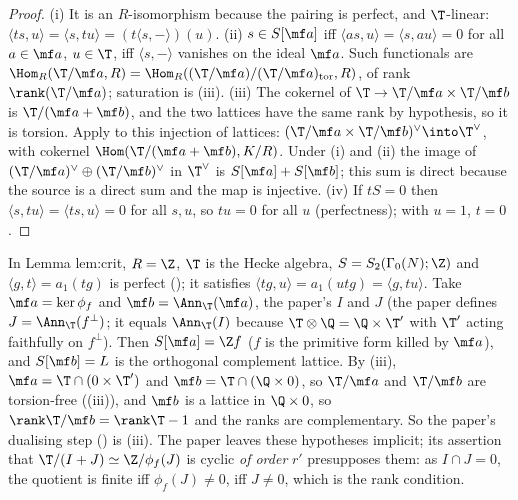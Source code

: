 \begin{proof}
(i) It is an $R$-isomorphism because the pairing is perfect, and $\T$-linear: $\langle ts,u\rangle=\langle s,tu\rangle=(t\langle s,-\rangle)(u)$.
(ii) $s\in S[\mf a]$ iff $\langle as,u\rangle=\langle s,au\rangle=0$ for all $a\in\mf a$, $u\in\T$, iff $\langle s,-\rangle$ vanishes on the ideal $\mf a$. Such functionals are
$\Hom_R(\T/\mf a,R)=\Hom_R((\T/\mf a)/(\T/\mf a)_{\mathrm{tor}},R)$, of rank $\rank(\T/\mf a)$; saturation is (iii).
(iii) The cokernel of $\T\to\T/\mf a\times\T/\mf b$ is $\T/(\mf a+\mf b)$, and the two lattices have the same rank by hypothesis, so it is torsion. Apply
 to this injection of lattices: $(\T/\mf a\times\T/\mf b)^\vee\into\T^\vee$, with cokernel $\Hom(\T/(\mf a+\mf b),K/R)$. Under (i)
and (ii) the image of $(\T/\mf a)^\vee\oplus(\T/\mf b)^\vee$ in $\T^\vee$ is $S[\mf a]+S[\mf b]$; this sum is direct because the source is a direct sum and the map is injective.
(iv) If $tS=0$ then $\langle s,tu\rangle=\langle ts,u\rangle=0$ for all $s,u$, so $tu=0$ for all $u$ (perfectness); with $u=1$, $t=0$.
\end{proof}

\begin{paperlink}\label{pl:modules:algebra-duality}
In Lemma lem:crit, $R=\Z$, $\T$ is the Hecke algebra, $S=S_2(\Gamma_0(N);\Z)$ and $\langle g,t\rangle=a_1(tg)$ is perfect (); it satisfies
$\langle tg,u\rangle=a_1(utg)=\langle g,tu\rangle$. Take $\mf a=\ker\phi_f$ and $\mf b=\Ann_\T(\mf a)$, the paper's $I$ and $J$ (the paper defines $J=\Ann_\T(f^\perp)$; it equals
$\Ann_\T(I)$ because $\T\otimes\Q=\Q\times\T'$ with $\T'$ acting faithfully on $f^\perp$). Then $S[\mf a]=\Z f$ ($f$ is the primitive form killed by $\mf a$), and
$S[\mf b]=L$ is the orthogonal complement lattice. By (iii), $\mf a=\T\cap(0\times\T')$ and $\mf b=\T\cap(\Q\times0)$, so
$\T/\mf a$ and $\T/\mf b$ are torsion-free ((iii)), and $\mf b$ is a lattice in $\Q\times0$, so $\rank\T/\mf b=\rank\T-1$ and the
ranks are complementary. So the paper's dualising step () is (iii). The paper leaves these hypotheses implicit; its assertion that
$\T/(I+J)\simeq\Z/\phi_f(J)$ is cyclic \emph{of order} $r'$ presupposes them: as $I\cap J=0$, the quotient is finite iff $\phi_f(J)\ne0$, iff $J\ne0$, which is
the rank condition.
\end{paperlink}

